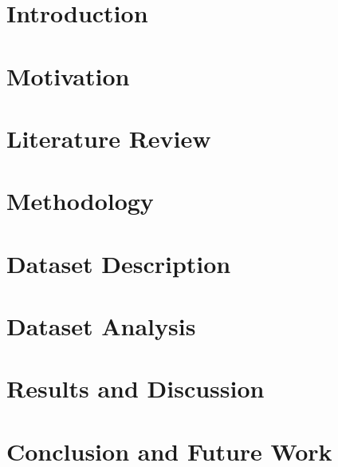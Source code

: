 \documentclass[12pt]{report}
\begin{document}






\tableofcontents

\cleardoublepage
{}
\listoffigures

\cleardoublepage
{}


\cleardoublepage
\chapter{ Introduction} \label{ch:intro}


\chapter{Motivation} \label{ch:background}


\chapter{Literature Review} \label{ch:Objective}



\chapter{Methodology } \label{ch:literature_review}





%

\chapter{Dataset Description} \label{ch:main_chapter2}
%
\chapter{ Dataset Analysis } \label{ch:experimental_results}

\chapter{Results and Discussion}\label{ch:main_chapter5}

\chapter{Conclusion and Future Work} \label{ch:Conclusion}




\printbibliography
\end{document}
